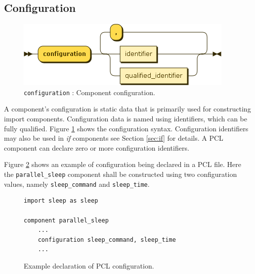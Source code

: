 \subsection{Configuration}\label{subsec:config}
\begin{figure}[h!]
  \centering
    \includegraphics[scale=\DiagramScale]{chapters/compiler/diagrams/configuration}
  \caption{\texttt{configuration} : Component configuration.}
  \label{fig:pcl-config}
\end{figure}
A component's configuration is static data that is primarily used for constructing import components. Configuration data is named using identifiers, which can be fully qualified. Figure \ref{fig:pcl-config} shows the configuration syntax. Configuration identifiers may also be used in \emph{if} components see Section \ref{sec:if} for details. A PCL component can declare zero or more configuration identifiers.

Figure \ref{fig:pcl-config-example} shows an example of configuration being declared in a PCL file. Here the \texttt{parallel\_sleep} component shall be constructed using two configuration values, namely \texttt{sleep\_command} and \texttt{sleep\_time}.
\begin{figure}[h!]
\begin{center}
\begin{verbatim}
import sleep as sleep

component parallel_sleep
    ...
    configuration sleep_command, sleep_time
    ...
\end{verbatim}
\end{center}
\caption{Example declaration of PCL configuration.}
\label{fig:pcl-config-example}
\end{figure}


